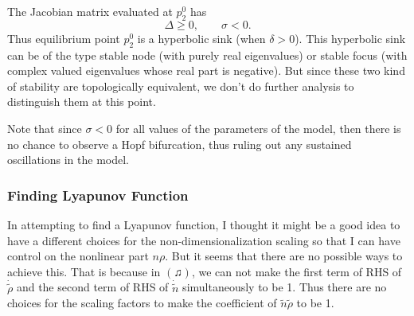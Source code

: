 \begin{observation}[stability of $p^0_2$]
	The Jacobian matrix evaluated at $p^0_2$ has
	\[ \Delta \geq 0, \qquad \sigma < 0. \]
	Thus equilibrium point $p^0_2$ is a hyperbolic sink (when $\delta > 0$). This hyperbolic sink can be of the type stable node (with purely real eigenvalues) or stable focus (with complex valued eigenvalues whose real part is negative). But since these two kind of stability are topologically equivalent, we don't do further analysis to distinguish them at this point.
\end{observation}

\begin{observation}
	Note that since $\sigma<0$ for all values of the parameters of the model, then there is no chance to observe a Hopf bifurcation, thus ruling out any sustained oscillations in the model.
\end{observation}

\subsubsection{Finding Lyapunov Function}
In attempting to find a Lyapunov function, I thought it might be a good idea to have a different choices for the non-dimensionalization scaling so that I can have control on the nonlinear part $n\rho$. But it seems that there are no possible ways to achieve this. That is because in $(\twonotes)$, we can not make the first term of RHS of $\dot{\tilde{\rho}}$ and the second term of RHS of $\dot{\tilde{n}}$ simultaneously to be 1. Thus there are no choices for the scaling factors to make the coefficient of $\tilde{n}\tilde{\rho}$ to be 1.


